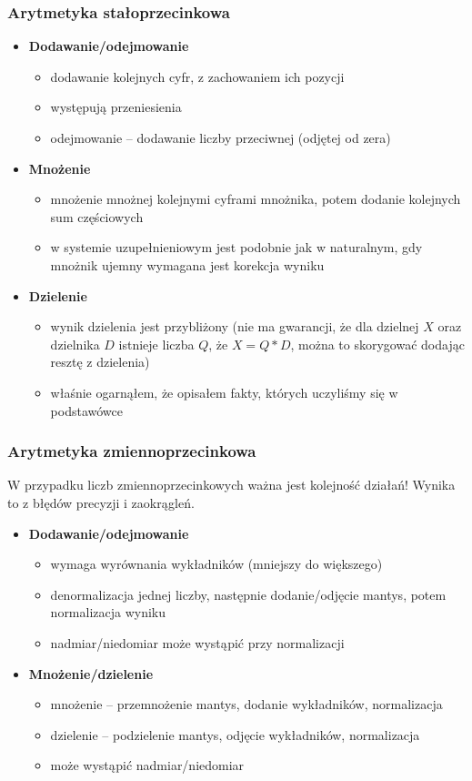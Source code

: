 \subsubsection{Arytmetyka stałoprzecinkowa}
\begin{itemize}
\item \textbf{Dodawanie/odejmowanie}
	\begin{itemize}
	\item dodawanie kolejnych cyfr, z zachowaniem ich pozycji
	\item występują przeniesienia
	\item odejmowanie -- dodawanie liczby przeciwnej (odjętej od zera)
	\end{itemize}
\item \textbf{Mnożenie}
	\begin{itemize}
	\item mnożenie mnożnej kolejnymi cyframi mnożnika, potem dodanie kolejnych sum częściowych
	\item w systemie uzupełnieniowym jest podobnie jak w naturalnym, gdy mnożnik ujemny wymagana jest korekcja wyniku
	\end{itemize}
\item \textbf{Dzielenie}
	\begin{itemize}
	\item wynik dzielenia jest przybliżony (nie ma gwarancji, że dla dzielnej $X$ oraz dzielnika $D$ istnieje liczba $Q$, że $X = Q * D$, można to skorygować dodając resztę z dzielenia)
	\item właśnie ogarnąłem, że opisałem fakty, których uczyliśmy się w podstawówce
	\end{itemize}
\end{itemize}

\subsubsection{Arytmetyka zmiennoprzecinkowa}
W przypadku liczb zmiennoprzecinkowych ważna jest kolejność działań!
Wynika to z błędów precyzji i zaokrągleń.

\begin{itemize}
\item \textbf{Dodawanie/odejmowanie}
	\begin{itemize}
	\item wymaga wyrównania wykładników (mniejszy do większego)
	\item denormalizacja jednej liczby, następnie dodanie/odjęcie mantys, potem normalizacja wyniku
	\item nadmiar/niedomiar może wystąpić przy normalizacji
	\end{itemize}
\item \textbf{Mnożenie/dzielenie}
	\begin{itemize}
	\item mnożenie -- przemnożenie mantys, dodanie wykładników, normalizacja
	\item dzielenie -- podzielenie mantys, odjęcie wykładników, normalizacja
	\item może wystąpić nadmiar/niedomiar
	\end{itemize}
\end{itemize}

